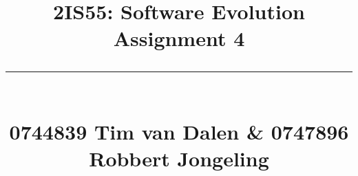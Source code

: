 \title{
	\huge\raggedright 2IS55: Software Evolution \hfill{\Large Assignment 4}\\ \vspace{-0.9\baselineskip}\rule{\linewidth}{1pt}\\
	\small\hfill 0744839 Tim van Dalen \& 0747896 Robbert Jongeling
	\normalsize
}

